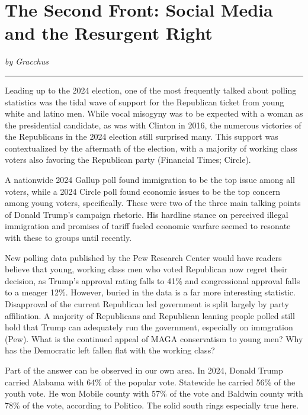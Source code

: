 \documentclass[
]{book}
\begin{document}
\section*{The Second Front: Social Media and the Resurgent Right}\label{the-second-front-social-media-and-the-resurgent-right}

\emph{by Gracchus}

\begin{center}\rule{0.5\linewidth}{0.5pt}\end{center}

Leading up to the 2024 election, one of the most frequently talked about polling statistics was the tidal wave of support for the Republican ticket from young white and latino men. While vocal misogyny was to be expected with a woman as the presidential candidate, as was with Clinton in 2016, the numerous victories of the Republicans in the 2024 election still surprised many. This support was contextualized by the aftermath of the election, with a majority of working class voters also favoring the Republican party (Financial Times; Circle).

A nationwide 2024 Gallup poll found immigration to be the top issue among all voters, while a 2024 Circle poll found economic issues to be the top concern among young voters, specifically. These were two of the three main talking points of Donald Trump's campaign rhetoric. His hardline stance on perceived illegal immigration and promises of tariff fueled economic warfare seemed to resonate with these to groups until recently.

New polling data published by the Pew Research Center would have readers believe that young, working class men who voted Republican now regret their decision, as Trump's approval rating falls to 41\% and congressional approval falls to a meager 12\%. However, buried in the data is a far more interesting statistic. Disapproval of the current Republican led government is split largely by party affiliation. A majority of Republicans and Republican leaning people polled still hold that Trump can adequately run the government, especially on immgration (Pew). What is the continued appeal of MAGA conservatism to young men? Why has the Democratic left fallen flat with the working class?

Part of the answer can be observed in our own area. In 2024, Donald Trump carried Alabama with 64\% of the popular vote. Statewide he carried 56\% of the youth vote. He won Mobile county with 57\% of the vote and Baldwin county with 78\% of the vote, according to Politico. The solid south rings especially true here.
\end{document}
